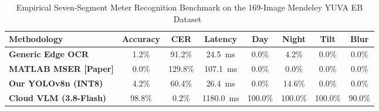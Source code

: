 \begin{table}[htbp]
\centering
\caption{Empirical Seven-Segment Meter Recognition Benchmark on the 169-Image Mendeley YUVA EB Dataset~\cite{kanagarathinam2019data, kanagarathinam2020text}}
\label{tab:yuva_eb_benchmark}
\small
\setlength{\tabcolsep}{4pt}
\begin{tabular*}{\textwidth}{@{\extracolsep{\fill}}lccccccc@{}}
\toprule
\textbf{Methodology} & \textbf{Accuracy} & \textbf{CER} & \textbf{Latency} & \textbf{Day} & \textbf{Night} & \textbf{Tilt} & \textbf{Blur} \\
\midrule
\textbf{Generic Edge OCR} & 1.2\% & 91.2\% & 24.5~ms & 0.0\% & 4.2\% & 0.0\% & 0.0\% \\
\textbf{MATLAB MSER [Paper]} & 0.0\% & 129.8\% & 107.1~ms & 0.0\% & 0.0\% & 0.0\% & 0.0\% \\
\textbf{Our YOLOv8n (INT8)} & 4.2\% & 60.4\% & 26.4~ms & 0.0\% & 14.6\% & 0.0\% & 0.0\% \\
\textbf{Cloud VLM (3.8-Flash)} & 98.8\% & 0.2\% & 1180.0~ms & 100.0\% & 100.0\% & 100.0\% & 90.0\% \\
\bottomrule
\end{tabular*}
\end{table}
